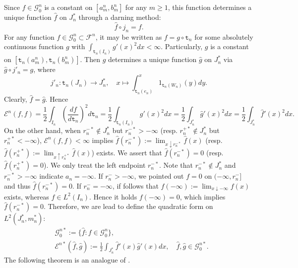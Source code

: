 \documentclass[a4paper]{amsart}
\theoremstyle{definition}
\theoremstyle{remark}
\numberwithin{equation}{section}
\begin{document}
Since $f\in \mathcal{G}^n_0$ is a constant on $[a^n_m, b^n_m]$ for any $m\geq 1$, this function determines a unique function $\hat{f}$ on $J^*_n$ through a darning method:
\[
	\hat{f}\circ j_n=f.
\]
For any function $f\in \mathcal{G}^n_0\subset {{\mathcal{F}}}^n$, it may be written as $f=g\circ {{\mathtt{t}}}_n$ for some absolutely continuous function $g$ with $\int_{{{\mathtt{t}}}_n(I_n)} g'(x)^2dx<\infty$. Particularly, $g$ is a constant on $[{{\mathtt{t}}}_n(a^n_m), {{\mathtt{t}}}_n(b^n_m)]$. Then $g$ determines a unique function $\hat{g}$ on $J^*_n$ via $\hat{g}\circ j'_n=g$, where
\[
	j'_n: {{\mathtt{t}}}_n(J_n)\rightarrow J^*_n,\quad  x\mapsto \int_{{{\mathtt{t}}}_n(e_n)}^{x} 1_{{{\mathtt{t}}}_n(W_n)}(y)dy.
\]
Clearly, $\hat{f}=\hat{g}$. Hence
\[ {{\mathcal{E}}}^n(f,f)=\frac{1}{2}\int_{I_n}\left(\frac{df}{d{{\mathtt{t}}}_n}\right)^2d{{\mathtt{t}}}_n=\frac{1}{2}\int_{{{\mathtt{t}}}_n(I_n)}g'(x)^2dx=\frac{1}{2}\int_{J^*_n}\hat{g}'(x)^2dx=\frac{1}{2}\int_{J^*_n}\hat{f}'(x)^2dx.
\]
On the other hand, when $r^{-*}_n\notin J^*_n$ but $r^{-*}_n>-\infty$ (resp. $r^{+*}_n\notin J^*_n$ but $r^{+*}_n<-\infty$), ${{\mathcal{E}}}^n(f,f)<\infty$ implies $\hat{f}(r^{-*}_n):=\lim_{x\downarrow r^{-*}_n}\hat{f}(x)$ (resp. $\hat{f}(r^{+*}_n):=\lim_{x\uparrow r^{+*}_n}\hat{f}(x)$) exists. We assert that $\hat{f}(r^{-*}_n)=0$ (resp. $\hat{f}(r^{+*}_n)=0$). We only treat the left endpoint $r^{-*}_n$. Note that $r^{-*}_n\notin J^*_n$ and $r^{-*}_n>-\infty$ indicate $a_n=-\infty$. If $r^-_n>-\infty$, we pointed out $f=0$ on $(-\infty, r^-_n]$ and thus $\hat{f}(r^{-*}_n)=0$. If $r^-_n=-\infty$, if follows that $f(-\infty):=\lim_{x\downarrow -\infty}f(x)$ exists, whereas $f\in L^2(I_n)$. Hence it holds $f(-\infty)=0$, which implies $\hat{f}(r^{-*}_n)=0$. Therefore, we are lead to define the quadratic form on $L^2(J^*_n, m^*_n)$:
\begin{equation}\label{EQ3GNF}
\begin{aligned}
	&\mathcal{G}^{n*}_0:=\{\hat{f}: f\in \mathcal{G}^n_0\}, \\
	&{{\mathcal{E}}}^{n*}(\hat{f},\hat{g}):=\frac{1}{2}\int_{J^*_n}\hat{f}'(x)\hat{g}'(x)dx,\quad \hat{f},\hat{g}\in \mathcal{G}^{n*}_0.
\end{aligned}
\end{equation}
The following theorem is an analogue of \cite[Theorem~3.2]{LY14}.
\end{document}
